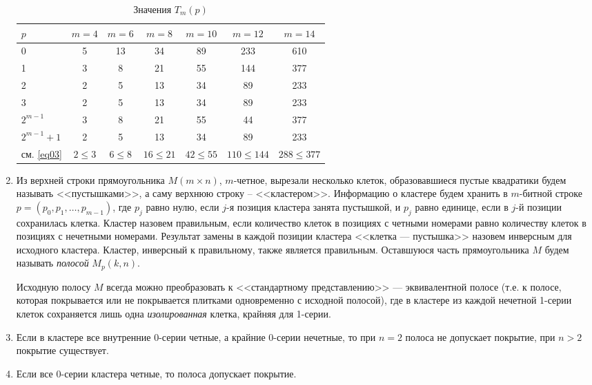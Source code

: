 \begin{enumerate}
\begin{table}[ht]
\caption{Значения $T_m(p)$}
\centering
\label{tab01}
\footnotesize{
\begin{tabular} {|p{2cm}|c|c|c|c|c|c| }
\hline
$p$&$m=4$&$m=6$&$m=8$&$m=10$&$m=12$&$m=14$\\
\hline
\hline
0&5&13&34&89&233&610\\
\hline
1&3&8&21&55&144&377\\
\hline
2&2&5&13&34&89&233\\
\hline
3&2&5&13&34&89&233\\
\hline
$2^{m-1}$&3&8&21&55&44&377\\
\hline
$2^{m-1}+1$&2&5&13&34&89&233\\
\hline
\hline
см. \eqref{eq03}&$2\leq 3$&$6\leq 8 $&$16\leq 21$&$42\leq 55$&$110\leq 144$&$288 \leq 377$\\
\hline
\end{tabular}
}
\end{table}
\item 
Из верхней строки прямоугольника $M(m\times n)$, $m$-четное, вырезали несколько клеток, образовавшиеся пустые квадратики будем называть <<пустышками>>, а саму верхнюю строку -- <<кластером>>. Информацию о кластере будем хранить в $m$-битной строке \linebreak $p=(p_0, p_1, \dots, p_{m-1})$, где 
$p_j$ равно нулю, если $j$-я позиция кластера занята пустышкой, и $p_j$ равно единице, если в $j$-й позиции сохранилась клетка. Кластер назовем правильным, если количество клеток в позициях с четными номерами равно количеству клеток в позициях с нечетными номерами. Результат замены в каждой позиции кластера <<клетка --- пустышка>> назовем инверсным для исходного кластера. Кластер, инверсный к правильному, также является правильным.
Оставшуюся часть прямоугольника $M$ будем называть {\it полосой} $M_p(k,n)$.

Исходную полосу $M$ всегда можно преобразовать к <<стандартному представлению>> --- эквивалентной полосе (т.е. к полосе, которая покрывается или не покрывается плитками одновременно с исходной полосой), где в кластере из каждой нечетной 1-серии клеток сохраняется лишь одна \textit{изолированная}  клетка, крайняя для 1-серии.

\item
Если в кластере все внутренние 0-серии четные, а крайние 0-серии нечетные, то при $n=2$ полоса не допускает покрытие, при $n>2$ покрытие существует.
\item
Если все 0-серии кластера четные, то полоса допускает покрытие. 


\end{enumerate}
